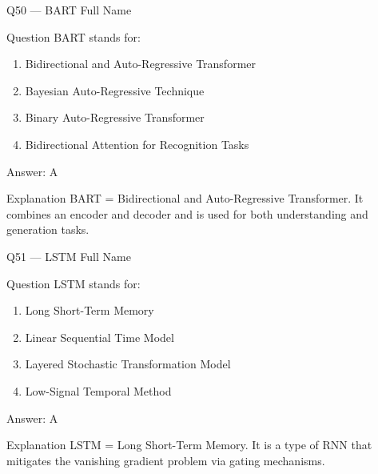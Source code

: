 \documentclass[aspectratio=169,8pt]{beamer}
\begin{document}
	\begin{frame}{Q50 --- BART Full Name}
		\begin{block}{Question}
			BART stands for:
			\begin{enumerate}
				\item Bidirectional and Auto-Regressive Transformer
				\item Bayesian Auto-Regressive Technique
				\item Binary Auto-Regressive Transformer
				\item Bidirectional Attention for Recognition Tasks
			\end{enumerate}
		\end{block}
		\begin{exampleblock}{Answer: A}\end{exampleblock}
		\begin{block}{Explanation}
			BART = Bidirectional and Auto-Regressive Transformer. It combines an encoder and decoder and is used for both understanding and generation tasks.
		\end{block}
	\end{frame}
	
	\begin{frame}{Q51 --- LSTM Full Name}
		\begin{block}{Question}
			LSTM stands for:
			\begin{enumerate}
				\item Long Short-Term Memory
				\item Linear Sequential Time Model
				\item Layered Stochastic Transformation Model
				\item Low-Signal Temporal Method
			\end{enumerate}
		\end{block}
		\begin{exampleblock}{Answer: A}\end{exampleblock}
		\begin{block}{Explanation}
			LSTM = Long Short-Term Memory. It is a type of RNN that mitigates the vanishing gradient problem via gating mechanisms.
		\end{block}
	\end{frame}
	
\end{document}
